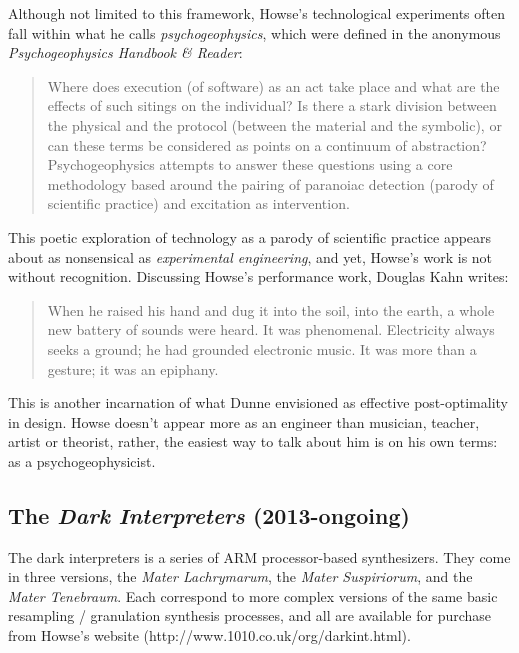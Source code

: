 Although not limited to this framework, Howse's technological experiments often fall within what he calls \emph{psychogeophysics}, which were defined in the anonymous \emph{Psychogeophysics Handbook \& Reader}: 

\begin{quote}
	
	Where does execution (of software) as an act take place and what are the effects of such sitings on the individual? Is there a stark division between the physical and the protocol (between the material and the symbolic), or can these terms be considered as points on a continuum of abstraction? Psychogeophysics attempts to answer these questions using a core methodology based around the pairing of paranoiac detection (parody of scientific practice) and excitation as intervention.
	
	\end{quote}
	
	\citep{anonymous2011}
	
This poetic exploration of technology as a parody of scientific practice appears about as nonsensical as \emph{experimental engineering}, and yet, Howse's work is not without recognition. Discussing Howse's performance work, Douglas Kahn writes: 
	
\begin{quote}

When he raised his hand and dug it into the soil, into the earth, a whole new battery of sounds were heard. It was phenomenal. Electricity always seeks a ground; he had grounded electronic music. It was more than a gesture; it was an epiphany.
\end{quote}

\citep{kahn2014}

This is another incarnation of what Dunne envisioned as effective post-optimality in design. Howse doesn't appear more as an engineer than musician, teacher, artist or theorist, rather, the easiest way to talk about him is on his own terms: as a psychogeophysicist.  

\subsection{The \textit{Dark Interpreters} (2013-ongoing)}

The dark interpreters is a series of ARM processor-based synthesizers. They come in three versions, the \emph{Mater Lachrymarum}, the \emph{Mater Suspiriorum}, and the \emph{Mater Tenebraum}. Each correspond to more complex versions of the same basic resampling / granulation synthesis processes, and all are available for purchase from Howse's website (http://www.1010.co.uk/org/darkint.html). 

